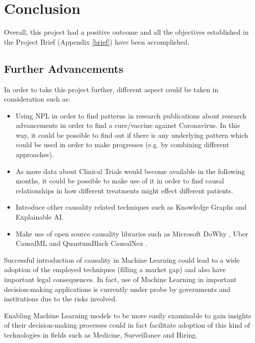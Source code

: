 \chapter{Conclusion}

\label{ch:planwork}
\setlength\lineskip{0pt}
\vspace*{15pt}

Overall, this project had a positive outcome and all the objectives established in the Project Brief (Appendix \ref{brief}) have been accomplished.

\section{Further Advancements}

In order to take this project further, different aspect could be taken in consideration such as:
\vspace{-0.2cm}
\begin{itemize}
    \item Using NPL in order to find patterns in research publications about research advancements in order to find a cure/vaccine against Coronavirus. In this way, it could be possible to find out if there is any underlying pattern which could be used in order to make progresses (e.g. by combining different approaches).
    \item As more data about Clinical Trials would become available in the following months, it could be possible to make use of it in order to find causal relationships in how different treatments might effect different patients. 
    \item Introduce other causality related techniques such as Knowledge Graphs and Explainable AI. 
    \item Make use of open source causality libraries such as Microsoft DoWhy \cite{dowhy}, Uber CausalML \cite{causalml} and QuantumBlack CausalNex \cite{causalnex}. 
\end{itemize}
\vspace{-0.2cm}
Successful introduction of causality in Machine Learning could lead to a wide adoption of the employed techniques (filling a market gap) and also have important legal consequences. In fact, use of Machine Learning in important decision-making applications is currently under probe by governments and institutions due to the risks involved.

Enabling Machine Learning models to be more easily examinable to gain insights of their decision-making processes could in fact facilitate adoption of this kind of technologies in fields such as Medicine, Surveillance and Hiring.